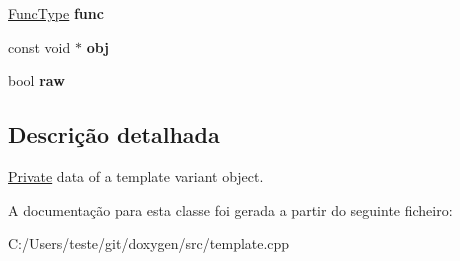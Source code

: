 \begin{DoxyCompactItemize}
\item 
\hypertarget{class_template_variant_1_1_private_a0a1315da8c616564f3d5c94beae8233c}{\hyperlink{class_template_variant_a9048747cd5dd98f5d42a53664324f7e4}{Func\-Type} {\bfseries func}}\label{class_template_variant_1_1_private_a0a1315da8c616564f3d5c94beae8233c}

\item 
\hypertarget{class_template_variant_1_1_private_a35f6e49437bc0043a8f517250b008184}{const void $\ast$ {\bfseries obj}}\label{class_template_variant_1_1_private_a35f6e49437bc0043a8f517250b008184}

\item 
\hypertarget{class_template_variant_1_1_private_a388d89b22cf20a999da0c692a3c3eb77}{bool {\bfseries raw}}\label{class_template_variant_1_1_private_a388d89b22cf20a999da0c692a3c3eb77}

\end{DoxyCompactItemize}


\subsection{Descrição detalhada}
\hyperlink{class_template_variant_1_1_private}{Private} data of a template variant object. 

A documentação para esta classe foi gerada a partir do seguinte ficheiro\-:\begin{DoxyCompactItemize}
\item 
C\-:/\-Users/teste/git/doxygen/src/template.\-cpp\end{DoxyCompactItemize}
